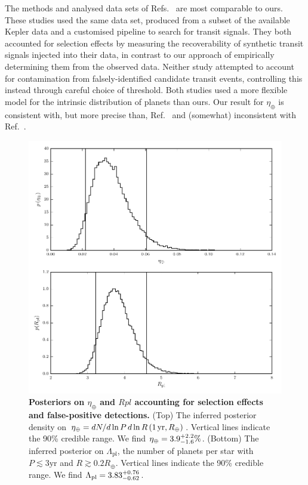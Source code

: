 \documentclass{nature}
\newcommand{\etaearth}{\eta_\oplus}
\newcommand{\REarth}{R_\oplus}
\newcommand{\Rpl}{\Lambda_\mathrm{pl}}
\begin{document}
The methods and analysed data sets of
Refs.\ \cite{Petigura2013,Foreman-Mackey2014} are most comparable to
ours.  These studies used the same data set,
produced\cite{Petigura2013} from a subset of the available Kepler data
and a customised pipeline to search for transit signals.  They both
accounted for selection effects by measuring the recoverability of
synthetic transit signals injected into their data, in contrast to our
approach of empirically determining them from the observed data.
Neither study attempted to account for contamination from
falsely-identified candidate transit events, controlling this instead
through careful choice of threshold.  Both studies used a more
flexible model for the intrinsic distribution of planets than ours.
Our result for $\etaearth$ is consistent with, but more precise than,
Ref.\ \cite{Foreman-Mackey2014} and (somewhat) inconsistent with
Ref.\ \cite{Petigura2013}.  


\begin{figure}
  \includegraphics[width=\columnwidth]{pars}
  \caption{\label{fig:eta-earth} \textbf{Posteriors on $\etaearth$ and
      $Rpl$ accounting for selection effects and false-positive
      detections.}  (Top) The inferred posterior density on $\etaearth
    = dN/d\ln P \, d\ln R \left( 1\, \textnormal{yr}, R_\oplus
    \right)$.  Vertical lines indicate the 90\% credible range.  We
    find $\etaearth = \earange$.  (Bottom) The inferred posterior on
    $\Rpl$, the number of planets per star with $P \lesssim 3
    \mathrm{yr}$ and $R \gtrsim 0.2 \REarth$.  Vertical lines indicate
    the 90\% credible range.  We find $\Rpl = \rplrange$.}
\end{figure}
\end{document}
